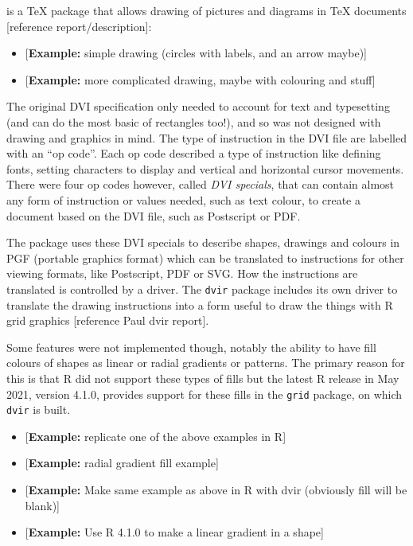 \documentclass[]{article}
\begin{document}
\Tikz{} is a \TeX{} package that allows drawing of pictures and diagrams
in \TeX{} documents {[}reference \Tikz{} report/description{]}:

\begin{itemize}
\item
  {[}\textbf{Example:} simple \Tikz{} drawing (circles with labels, and
  an arrow maybe){]}
\item
  {[}\textbf{Example:} more complicated \Tikz{} drawing, maybe with
  colouring and stuff{]}
\end{itemize}

The original DVI specification only needed to account for text and
typesetting (and can do the most basic of rectangles too!), and so was
not designed with drawing and graphics in mind. The type of instruction
in the DVI file are labelled with an ``op code''. Each op code described
a type of instruction like defining fonts, setting characters to display
and vertical and horizontal cursor movements. There were four op codes
however, called \emph{DVI specials}, that can contain almost any form of
instruction or values needed, such as text colour, to create a document
based on the DVI file, such as Postscript or PDF.

The \Tikz{} package uses these DVI specials to describe shapes, drawings
and colours in PGF (portable graphics format) which can be translated to
instructions for other viewing formats, like Postscript, PDF or SVG. How
the instructions are translated is controlled by a \Tikz{} driver. The
\texttt{dvir} package includes its own \Tikz{} driver to translate the
drawing instructions into a form useful to draw the things with R grid
graphics {[}reference Paul dvir \Tikz{} report{]}.

Some \Tikz{} features were not implemented though, notably the ability
to have fill colours of shapes as linear or radial gradients or
patterns. The primary reason for this is that R did not support these
types of fills but the latest R release in May 2021, version 4.1.0,
provides support for these fills in the \texttt{grid} package, on which
\texttt{dvir} is built.

\begin{itemize}
\item
  {[}\textbf{Example:} replicate one of the above examples in R{]}
\item
  {[}\textbf{Example:} \Tikz{} radial gradient fill example{]}
\item
  {[}\textbf{Example:} Make same \Tikz{} example as above in R with dvir
  (obviously fill will be blank){]}
\item
  {[}\textbf{Example:} Use R 4.1.0 to make a linear gradient in a
  shape{]}
\end{itemize}
\end{document}
